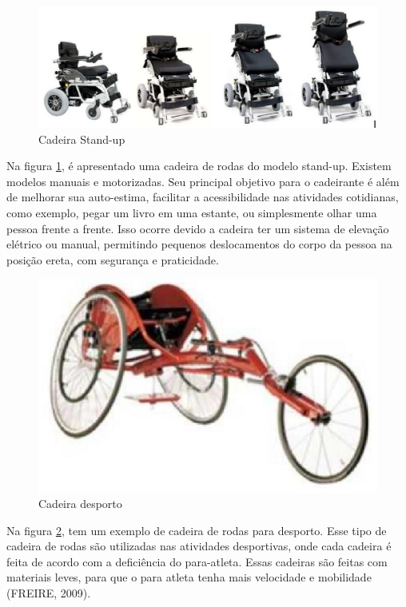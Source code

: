 \begin{figure}[!htb]
  \centering
  \includegraphics[keepaspectratio=true,scale=0.50]{figuras/introducao/versoes}
  \caption{Cadeira Stand-up}
  \label{fig:stand_up}
\end{figure}


Na figura \ref{fig:stand_up}, é apresentado uma cadeira de rodas do modelo stand-up. Existem modelos manuais e motorizadas. Seu principal objetivo para o cadeirante é além de melhorar sua auto-estima, facilitar a acessibilidade nas atividades cotidianas, como exemplo, pegar um livro em uma estante, ou simplesmente olhar uma pessoa frente a frente. Isso ocorre devido a cadeira ter um sistema de elevação elétrico ou manual, permitindo pequenos deslocamentos do corpo da pessoa na posição ereta, com segurança e praticidade.

\begin{figure}[!htb]
  \centering
  \includegraphics[keepaspectratio=true,scale=0.50]{figuras/introducao/cadeira_desporte}
  \caption{Cadeira desporto}
  \label{fig:desporto}
\end{figure}


Na figura \ref{fig:desporto}, tem um exemplo de cadeira de rodas para desporto. Esse tipo de cadeira de rodas são utilizadas nas atividades desportivas, onde cada cadeira é feita de acordo com a deficiência do para-atleta. Essas cadeiras são feitas com materiais leves, para que o para atleta tenha mais velocidade e mobilidade (FREIRE, 2009).

